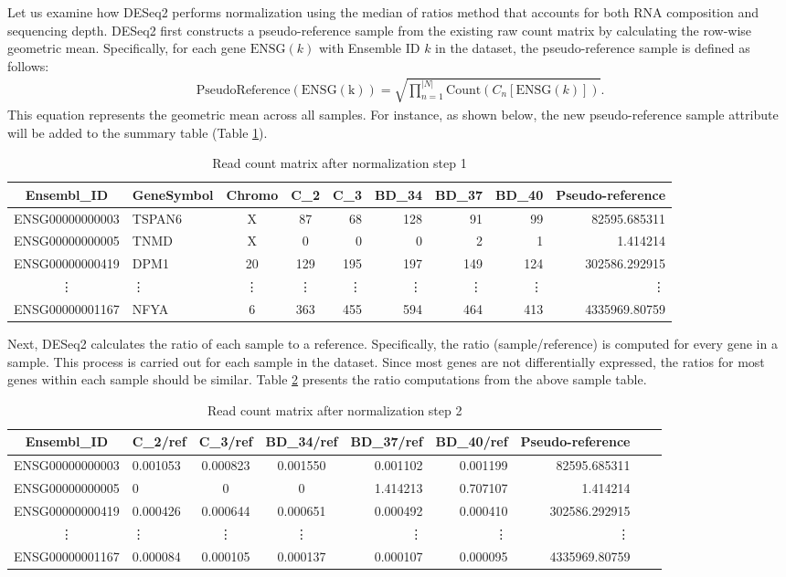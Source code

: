 \documentclass{article}
\newcommand{\abs}[1]{\left\lvert #1 \right\rvert} %
\begin{document}
Let us examine how DESeq2 performs normalization using the median of ratios method that accounts for both RNA composition and sequencing depth. DESeq2 first constructs a pseudo-reference sample from the existing raw count matrix by calculating the row-wise geometric mean. Specifically, for each gene $\mathrm{ENSG}(k)$ with Ensemble ID $k$ in the dataset, the pseudo-reference sample is defined as follows:
\begin{align}
    \mathrm{PseudoReference}(\mathrm{ENSG(k)}) = \sqrt{\prod_{n=1}^{\abs{N}} \mathrm{Count}(C_n[\mathrm{ENSG}(k)])}.
\end{align}
This equation represents the geometric mean across all samples. For instance, as shown below, the new pseudo-reference sample attribute will be added to the summary table (Table \ref{table:pseudo_ref}).
\begin{table}[H]
\centering
\begin{tabular}{clccrrrrr}
\toprule
Ensembl\_ID & GeneSymbol & Chromo & C\_2 & C\_3 & BD\_34 & BD\_37 & BD\_40 & Pseudo-reference\\
\midrule
ENSG00000000003 & TSPAN6 & X & 87 & 68 & 128 & 91 & 99 & 82595.685311 \\
ENSG00000000005 & TNMD & X & 0 & 0 & 0 & 2 & 1 & 1.414214 \\
ENSG00000000419 & DPM1 & 20 & 129 & 195 & 197 & 149 & 124 & 302586.292915 \\
\vdots & \vdots & \vdots & \vdots & \vdots & \vdots & \vdots & \vdots & \vdots \\
ENSG00000001167 & NFYA & 6 & 363 & 455 & 594 & 464 & 413 & 4335969.80759 \\
\bottomrule
\end{tabular}
\caption{Read count matrix after normalization step 1}
\label{table:pseudo_ref}
\end{table}
Next, DESeq2 calculates the ratio of each sample to a reference. Specifically, the ratio (sample/reference) is computed for every gene in a sample. This process is carried out for each sample in the dataset. Since most genes are not differentially expressed, the ratios for most genes within each sample should be similar. Table \ref{table:count_ref_ratio} presents the ratio computations from the above sample table.
\begin{table}[H]
\centering
\begin{tabular}{clccrrrrr}
\toprule
Ensembl\_ID & C\_2/ref & C\_3/ref & BD\_34/ref & BD\_37/ref & BD\_40/ref & Pseudo-reference \\
\midrule
ENSG00000000003 & 0.001053 & 0.000823 & 0.001550 & 0.001102 & 0.001199 & 82595.685311 \\
ENSG00000000005 & 0 & 0 & 0 & 1.414213 & 0.707107 & 1.414214 \\
ENSG00000000419 & 0.000426 & 0.000644 & 0.000651 & 0.000492 & 0.000410 & 302586.292915 \\
\vdots & \vdots & \vdots & \vdots & \vdots & \vdots & \vdots \\
ENSG00000001167 & 0.000084 & 0.000105 & 0.000137 & 0.000107 & 0.000095 & 4335969.80759 \\
\bottomrule
\end{tabular}
\caption{Read count matrix after normalization step 2}
\label{table:count_ref_ratio}
\end{table}
\end{document}
